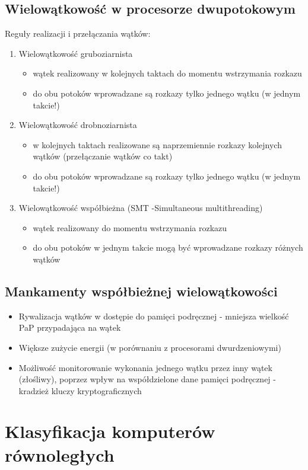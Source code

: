 	\subsection{Wielowątkowość w procesorze dwupotokowym}
		Reguły realizacji i przełączania wątków:
		\begin{enumerate}
			\item Wielowątkowość gruboziarnista
			\begin{itemize}
				\item wątek realizowany w kolejnych taktach do momentu wstrzymania rozkazu
				\item do obu potoków wprowadzane są rozkazy tylko jednego wątku (w jednym takcie!)
			\end{itemize}
			\item Wielowątkowość drobnoziarnista
			\begin{itemize}
				\item w kolejnych taktach realizowane są naprzemiennie rozkazy kolejnych wątków (przełączanie wątków co takt)
				\item do obu potoków wprowadzane są rozkazy tylko jednego wątku (w jednym takcie!)
			\end{itemize}
			\item Wielowątkowość współbieżna (SMT -Simultaneous multithreading)
			\begin{itemize}
				\item wątek realizowany do momentu wstrzymania rozkazu
				\item do obu potoków w jednym takcie mogą być wprowadzane rozkazy różnych wątków
			\end{itemize}
		\end{enumerate}
	\subsection{Mankamenty współbieżnej wielowątkowości}
		\begin{itemize}
			\item Rywalizacja wątków w dostępie do pamięci podręcznej - mniejsza wielkość PaP przypadająca na wątek
			\item Większe zużycie energii (w porównaniu z procesorami dwurdzeniowymi)
			\item Możliwość monitorowanie wykonania jednego wątku przez inny wątek (złośliwy), poprzez wpływ na współdzielone dane pamięci podręcznej - kradzież kluczy kryptograficznych
		\end{itemize}

\section{Klasyfikacja komputerów równoległych}
